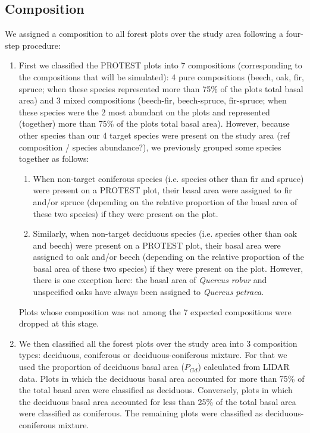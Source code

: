 \documentclass[a4paper]{article}
\begin{document}

\subsection*{Composition}

We assigned a composition to all forest plots over the study area following a four-step procedure:

\begin{enumerate}

    \item First we classified the PROTEST plots into 7 compositions (corresponding to the compositions that will be simulated): 4 pure compositions (beech, oak, fir, spruce; when these species represented more than 75\% of the plots total basal area) and 3 mixed compositions (beech-fir, beech-spruce, fir-spruce; when these species were the 2 most abundant on the plots and represented (together) more than 75\% of the plots total basal area). However, because other species than our 4 target species were present on the study area (ref composition / species abundance?), we previously grouped some species together as follows:

    \begin{enumerate}

        \item When non-target coniferous species (i.e. species other than fir and spruce) were present on a PROTEST plot, their basal area were assigned to fir and/or spruce (depending on the relative proportion of the basal area of these two species) if they were present on the plot.

        \item Similarly, when non-target deciduous species (i.e. species other than oak and beech) were present on a PROTEST plot, their basal area were assigned to oak and/or beech (depending on the relative proportion of the basal area of these two species) if they were present on the plot. However, there is one exception here: the basal area of \textit{Quercus robur} and unspecified oaks have always been assigned to \textit{Quercus petraea}.

    \end{enumerate}

    Plots whose composition was not among the 7 expected compositions were dropped at this stage.

    \item We then classified all the forest plots over the study area into 3 composition types: deciduous, coniferous or deciduous-coniferous mixture. For that we used the proportion of deciduous basal area ($P_{Gd}$) calculated from LIDAR data. Plots in which the deciduous basal area accounted for more than 75\% of the total basal area were classified as deciduous. Conversely, plots in which the deciduous basal area accounted for less than 25\% of the total basal area were classified as coniferous. The remaining plots were classified as deciduous-coniferous mixture.


\end{enumerate}
\end{document}

